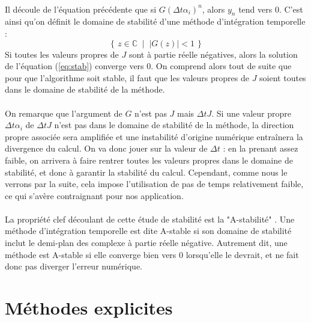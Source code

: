     \paragraph{}
    Il découle de l'équation précédente que si $G\left(\Delta t\alpha_i\right)^n$, alors $y_n$ tend vers 0.
    C'est ainsi qu'on définit le domaine de stabilité d'une méthode d'intégration temporelle :
    \[\left\{\,z\in\mathbb{C}\;\mid\;\left|G\left(z\right)\right| < 1\,\right\}\]
    Si toutes les valeurs propres de $J$ sont à partie réelle négatives, alors la solution de l'équation (\ref{eq:stab}) converge vers 0.
    On comprend alors tout de suite que pour que l'algorithme soit stable, il faut que les valeurs propres de $J$ soient toutes dans le domaine de stabilité de la méthode.

    \paragraph{}
    On remarque que l'argument de $G$ n'est pas $J$ mais $\Delta tJ$.
    Si une valeur propre $\Delta t\alpha_i$ de $\Delta tJ$ n'est pas dans le domaine de stabilité de la méthode, la direction propre associée sera amplifiée et une instabilité d'origine numérique entraînera la divergence du calcul.
    On va donc jouer sur la valeur de $\Delta t$ : en la prenant assez faible, on arrivera à faire rentrer toutes les valeurs propres dans le domaine de stabilité, et donc à garantir la stabilité du calcul.
    Cependant, comme nous le verrons par la suite, cela impose l'utilisation de pas de temps relativement faible, ce qui s'avère contraignant pour nos application.

    \paragraph{}
    La propriété clef découlant de cette étude de stabilité est la "A-stabilité" \cite{Dahlquist1963}.
    Une méthode d'intégration temporelle est dite A-stable si son domaine de stabilité inclut le demi-plan des complexe à partie réelle négative.
    Autrement dit, une méthode est A-stable si elle converge bien vers 0 lorsqu'elle le devrait, et ne fait donc pas diverger l'erreur numérique.


\section{Méthodes explicites}

